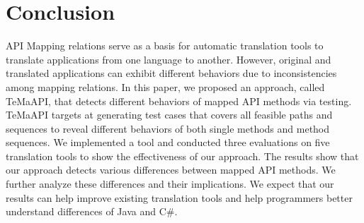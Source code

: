 \section{Conclusion}
\label{sec:conclusion}

API Mapping relations serve as a basis for automatic translation tools to translate applications from one language to another. However, original and translated applications can exhibit different behaviors due to inconsistencies among mapping relations. In this paper, we proposed an approach, called TeMaAPI, that detects different behaviors of mapped API methods via testing. TeMaAPI targets at generating test cases that covers all feasible paths and  sequences to reveal different behaviors of both single methods and method sequences. We implemented a tool and conducted three evaluations on five translation tools to show the effectiveness of our approach. The results show that our approach detects various differences between mapped API methods. We further analyze these differences and their implications. We expect that our results can help improve existing translation tools and help programmers better understand differences of Java and C\#.

